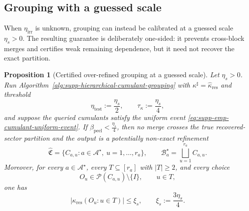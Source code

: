 \documentclass[
  aps,
  prx,
  reprint,
  superscriptaddress,
  amsmath,
  amssymb,
  nofootinbib,
  longbibliography
]{revtex4-2}
\newtheorem{proposition}[theorem]{Proposition}
\begin{document}
\subsection{Grouping with a guessed scale}
\label{sec:supp-guessed-scale-overrefinement}

When $\eta_{\mathrm{irr}}$ is unknown, grouping can instead be calibrated at
a guessed scale $\eta_s>0$.  The resulting guarantee is deliberately
one-sided: it prevents cross-block merges and certifies weak remaining
dependence, but it need not recover the exact partition.

\begin{proposition}[Certified over-refined grouping at a guessed scale]
\label{prop:supp-guessed-scale-overrefined-grouping}
Let $\eta_s>0$.  Run
Algorithm~\ref{alg:supp-hierarchical-cumulant-grouping} with
$\kappa^\sharp=\widehat\kappa_{\mathrm{res}}$ and threshold
\begin{equation}
\eta_{\mathrm{test}}:=\frac{\eta_s}{2},
\qquad
\tau_\kappa:=\frac{\eta_s}{4},
\end{equation}
and suppose the queried cumulants satisfy the uniform event
\eqref{eq:supp-emp-cumulant-uniform-event}.  If
$\beta_{\mathrm{peel}}<\frac{\eta_s}{4}$, then no merge crosses the true
recovered-sector partition and the output
is a potentially non-exact refinement
\begin{equation}
\widehat{\mathfrak C}
=
\{C_{a,u}:a\in\mathcal A^\star,\ u=1,\dots,r_a\},
\qquad
\mathcal B_a^\star
=
\bigsqcup_{u=1}^{r_a}C_{a,u}.
\label{eq:supp-guessed-scale-refined-partition}
\end{equation}
Moreover, for every $a\in\mathcal A^\star$, every
$T\subseteq[r_a]$ with $|T|\ge2$, and every choice
\begin{equation}
O_u\in\mathcal P(C_{a,u})\setminus\{I\},
\qquad u\in T,
\end{equation}
one has
\begin{equation}
\left|
\kappa_{\mathrm{res}}(O_u:u\in T)
\right|
\le
\xi_s,
\qquad
\xi_s:=\frac{3\eta_s}{4}.
\label{eq:supp-guessed-scale-small-final-cumulants}
\end{equation}
\end{proposition}
\end{document}

